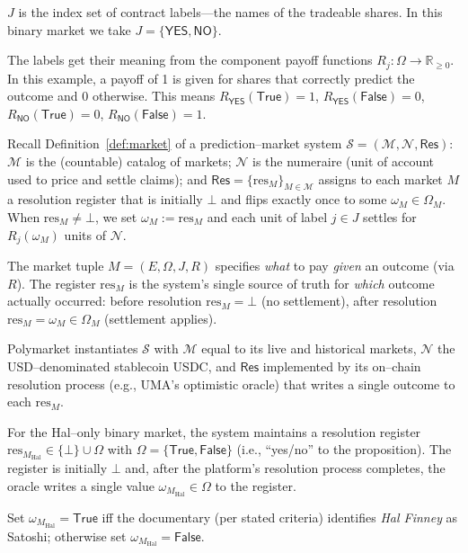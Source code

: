$J$ is the index set of contract labels—the names of the tradeable shares. In this binary market we take $J=\{\textsf{YES},\textsf{NO}\}$. 

The labels get their meaning from the component payoff functions $R_j:\Omega\to\mathbb{R}_{\ge 0}$. In this example, a payoff of 1 is given for shares that correctly predict the outcome and 0 otherwise. This means $R_{\textsf{YES}}(\mathsf{True})=1$, $R_{\textsf{YES}}(\mathsf{False})=0$, $R_{\textsf{NO}}(\mathsf{True})=0$, $R_{\textsf{NO}}(\mathsf{False})=1$.

Recall Definition~\ref{def:market} of a prediction--market system $\mathcal{S}=(\mathcal{M},\mathcal{N},\mathsf{Res})$:
$\mathcal{M}$ is the (countable) catalog of markets; $\mathcal{N}$ is the numeraire (unit of account used to price and settle claims);
and $\mathsf{Res}=\{\mathrm{res}_M\}_{M\in\mathcal{M}}$ assigns to each market $M$ a resolution register that is initially
$\bot$ and flips exactly once to some $\omega_M\in\Omega_M$.
When $\mathrm{res}_M\neq\bot$, we set $\omega_M:=\mathrm{res}_M$ and each unit of label $j\in J$ settles for $R_j(\omega_M)$ units of $\mathcal{N}$.

The market tuple $M=(E,\Omega,J,R)$ specifies \emph{what} to pay \emph{given} an outcome (via $R$).
The register $\mathrm{res}_M$ is the system’s single source of truth for \emph{which} outcome actually occurred:
before resolution $\mathrm{res}_M=\bot$ (no settlement), after resolution $\mathrm{res}_M=\omega_M\in\Omega_M$ (settlement applies).

Polymarket instantiates $\mathcal{S}$ with $\mathcal{M}$ equal to its live and historical markets, $\mathcal{N}$ the USD–denominated stablecoin USDC, and $\mathsf{Res}$ implemented by its on–chain resolution process (e.g., UMA’s optimistic oracle) that writes a single outcome to each $\mathrm{res}_M$.

For the Hal–only binary market, the system maintains a resolution register
$\mathrm{res}_{M_{\mathrm{Hal}}}\in\{\bot\}\cup\Omega$ with
$\Omega=\{\mathsf{True},\mathsf{False}\}$ (i.e., “yes/no” to the proposition).
The register is initially $\bot$ and, after the platform’s resolution process completes, the oracle writes a single value
$\omega_{M_{\mathrm{Hal}}}\in\Omega$ to the register.

Set $\omega_{M_{\mathrm{Hal}}}=\mathsf{True}$ iff the documentary (per stated criteria) identifies \emph{Hal Finney} as Satoshi; otherwise set $\omega_{M_{\mathrm{Hal}}}=\mathsf{False}$.

